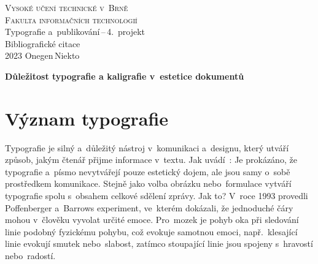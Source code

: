 \documentclass[a4paper, 11pt]{article}
\begin{document}
\begin{titlepage}
	\begin{center}
		{\Huge \textsc{Vysoké učení technické v~Brně}\\}
		{\huge \textsc{Fakulta informačních technologií}\\}
		{\LARGE Typografie a~publikování\,--\,4.\ projekt\\}
		{\Huge Bibliografické citace\\}
		{\Large 2023 \hfill Onegen\,Niekto}
	\end{center}
\end{titlepage}

\begin{center}
	\Large
	\textbf{Důležitost typografie a kaligrafie v~estetice dokumentů}
	\bigskip
\end{center}
\section*{Význam typografie}

Typografie je silný a~důležitý nástroj v~komunikaci a~designu, který utváří
způsob, jakým čtenář přijme informace v~textu.
Jak uvádí~\textcite{Koch:2012:EmotionIT}: 
Je prokázáno, že typografie a~písmo nevytvářejí pouze estetický dojem,
ale jsou samy o~sobě prostředkem komunikace. Stejně jako volba obrázku
nebo~formulace vytváří typografie spolu s~obsahem
celkové sdělení zprávy. \parencite{Pilka:2019:CharakterPisma}
Jak to? V~roce 1993 provedli Poffenberger a~Barrows experiment,
ve~kterém dokázali, že jednoduché čáry mohou v~člověku vyvolat určité emoce.
Pro~mozek je pohyb oka při sledování linie podobný fyzickému pohybu,
což evokuje samotnou emoci, např.~klesající linie evokují smutek nebo~slabost,
zatímco stoupající linie jsou spojeny s~hravostí nebo~radostí.
\parencite{Sladovnikova:2021:EmoceTextu}

\newpage
\renewcommand{\refname}{Literatúra}
\printbibliography{}
\end{document}
